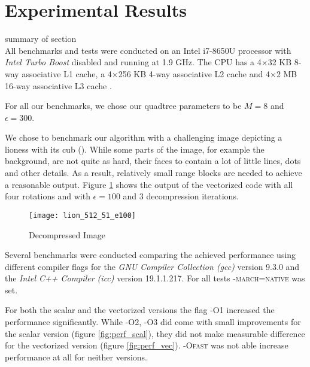 \section{Experimental Results}\label{sec:exp}

summary of section\\

 All benchmarks and tests were conducted on an Intel
i7-8650U processor with \textit{Intel Turbo Boost} disabled and running at 1.9
GHz. The CPU has a 4$\times$32 KB 8-way associative L1 cache, a 4$\times$256 KB
4-way associative L2 cache and 4$\times$2 MB 16-way associative L3 cache
\cite{intel-opt-manual}.

For all our benchmarks, we chose our quadtree parameters to be $M=8$ and $\epsilon=300$.

We chose to benchmark our algorithm with a challenging image depicting a lioness
with its cub (\cite{lions}). While some parts of the image, for example the
background, are not quite as hard, their faces to contain a lot of little lines,
dots and other details. As a result, relatively small range blocks are needed to
achieve a reasonable output. Figure \ref{fig:lions} shows the output of the
vectorized code with all four rotations and with $\epsilon=100$ and 3
decompression iterations.
\begin{figure}[H]
  \centering
  \texttt{[image: lion\_512\_51\_e100]}
  \caption{Decompressed Image}
  \label{fig:lions}
\end{figure}


 Several benchmarks were conducted comparing the achieved
performance using different compiler flags for the \textit{GNU Compiler
  Collection (gcc)} version 9.3.0 and the \textit{Intel C++ Compiler (icc)}
version 19.1.1.217. For all tests \textsc{-march=native} was set.

For both the scalar and the vectorized versions the flag \textsc{-O1} increased
the performance significantly. While \textsc{-O2}, \textsc{-O3} did come with
small improvements for the scalar version (figure \ref{fig:perf_scal}), they did
not make measurable difference for the vectorized version (figure
\ref{fig:perf_vec}). \textsc{-Ofast} was not able increase performance at all
for neither versions.

